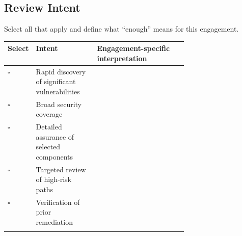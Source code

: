 \documentclass[10pt]{article}
\newcommand{\checkbox}{\ensuremath{\square}}
\begin{document}
\subsection{Review Intent}
Select all that apply and define what ``enough'' means for this engagement.
\par\smallskip\noindent\begin{tabularx}{\linewidth}{@{}C{0.07\linewidth}L{0.34\linewidth}Y@{}}
\toprule
Select & Intent & Engagement-specific interpretation \\
\midrule
\checkbox & Rapid discovery of significant vulnerabilities & \\ \addlinespace[1.2em]
\checkbox & Broad security coverage & \\ \addlinespace[1.2em]
\checkbox & Detailed assurance of selected components & \\ \addlinespace[1.2em]
\checkbox & Targeted review of high-risk paths & \\ \addlinespace[1.2em]
\checkbox & Verification of prior remediation & \\ \addlinespace[1.2em]
\bottomrule
\end{tabularx}
\clearpage
\end{document}
